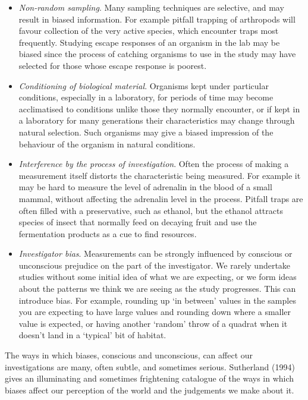 \documentclass[]{book}
\begin{document}
\begin{itemize}
\item
  \emph{Non-random sampling}. Many sampling techniques are selective,
  and may result in biased information. For example pitfall trapping of
  arthropods will favour collection of the very active species, which
  encounter traps most frequently. Studying escape responses of an
  organism in the lab may be biased since the process of catching
  organisms to use in the study may have selected for those whose escape
  response is poorest.
\item
  \emph{Conditioning of biological material}. Organisms kept under
  particular conditions, especially in a laboratory, for periods of time
  may become acclimatised to conditions unlike those they normally
  encounter, or if kept in a laboratory for many generations their
  characteristics may change through natural selection. Such organisms
  may give a biased impression of the behaviour of the organism in
  natural conditions.
\item
  \emph{Interference by the process of investigation}. Often the process
  of making a measurement itself distorts the characteristic being
  measured. For example it may be hard to measure the level of adrenalin
  in the blood of a small mammal, without affecting the adrenalin level
  in the process. Pitfall traps are often filled with a preservative,
  such as ethanol, but the ethanol attracts species of insect that
  normally feed on decaying fruit and use the fermentation products as a
  cue to find resources.
\item
  \emph{Investigator bias}. Measurements can be strongly influenced by
  conscious or unconscious prejudice on the part of the investigator. We
  rarely undertake studies without some initial idea of what we are
  expecting, or we form ideas about the patterns we think we are seeing
  as the study progresses. This can introduce bias. For example,
  rounding up `in between' values in the samples you are expecting to
  have large values and rounding down where a smaller value is expected,
  or having another `random' throw of a quadrat when it doesn't land in
  a `typical' bit of habitat.
\end{itemize}

The ways in which biases, conscious and unconscious, can affect our
investigations are many, often subtle, and sometimes serious. Sutherland
(1994) gives an illuminating and sometimes frightening catalogue of the
ways in which biases affect our perception of the world and the
judgements we make about it.
\end{document}
